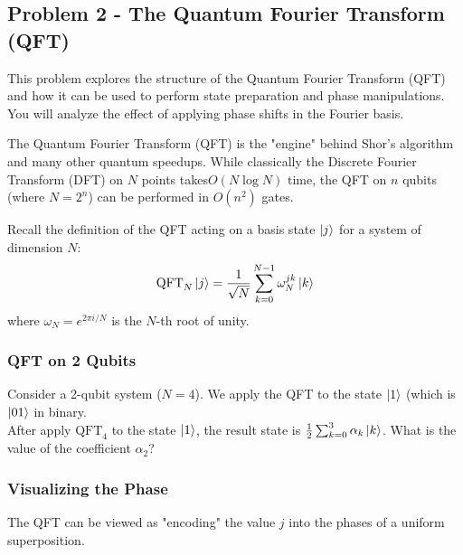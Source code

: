 \subsection{Problem 2 - The Quantum Fourier Transform (QFT)}
This problem explores the structure of the Quantum Fourier Transform (QFT) and how it can be used to perform state preparation and phase manipulations. You will analyze the effect of applying phase shifts in the Fourier basis.

The Quantum Fourier Transform (QFT) is the "engine" behind Shor’s algorithm and many other quantum speedups. While classically the Discrete Fourier Transform (DFT) on $N$ points takes$O(N\log N)$ time, the QFT on $n$ qubits (where $N = 2^n$) can be performed in $O(n^2)$ gates.

Recall the definition of the QFT acting on a basis state $\ket{j}$ for a system of dimension $N$: 
\begin{equation}
    \mathrm{QFT}_N \ket{j} = \frac{1}{\sqrt{N}} \sum_{k=0}^{N-1}\omega_N^{jk}\ket{k}
\end{equation}
where $\omega_N = e^{2\pi i/N}$ is the $N$-th root of unity.

\subsubsection{QFT on 2 Qubits}
Consider a 2-qubit system ($N=4$). We apply the QFT to the state $\ket{1}$ (which is $\ket{01}$ in binary.\\

After apply $\mathrm{QFT}_4$ to the state $\ket{1}$, the result state is $\frac{1}{2} \sum_{k=0}^3 \alpha_k \ket{k}$. What is the value of the coefficient $\alpha_2$? 

\noindent{}
\subsubsection{Visualizing the Phase}
The QFT can be viewed as "encoding" the value $j$ into the phases of a uniform superposition. \\

